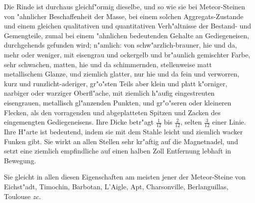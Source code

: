 \documentclass[a4paper, 11pt, oneside, german]{article}
\begin{document}
Die Rinde ist durchaus gleichf"ormig dieselbe, und so wie sie bei Meteor-Steinen von "ahnlicher Beschaffenheit der Masse, bei einem solchen Aggregats-Zustande und einem gleichen qualitativen und quantitativen Verh"altnisse der Bestand- und Gemengteile, zumal bei einem "ahnlichen bedeutenden Gehalte an Gediegeneisen, durchgehends gefunden wird; n"amlich: von schw"arzlich-brauner, hie und da, mehr oder weniger, mit eisengrau und ockergelb und br"aunlich gemischter Farbe, sehr schwachen, matten, hie und da schimmernden, stellenweise matt metallischem Glanze, und ziemlich glatter, nur hie und da fein und verworren, kurz und runzlicht-aderiger, gr"o"sten Teils aber klein und platt k"orniger, narbiger oder warziger Oberfl"ache, mit ziemlich h"aufig eingestreuten eisengrauen, metallisch gl"anzenden Punkten, und gr"o"seren oder kleineren Flecken, als den vorragenden und abgeplatteten Spitzen und Zacken des eingemengten Gediegeneisens. Ihre Dicke betr"agt $\frac{1}{12}$ bis $\frac{2}{12}$, selten $\frac{3}{12}$ einer Linie. Ihre H"arte ist bedeutend, indem sie mit dem Stahle leicht und ziemlich wacker Funken gibt. Sie wirkt an allen Stellen sehr kr"aftig auf die Magnetnadel, und setzt eine ziemlich empfindliche auf einen halben Zoll Entfernung lebhaft in Bewegung.

Sie gleicht in allen diesen Eigenschaften am meisten jener der Meteor-Steine von Eichst"adt, Timochin, Barbotan, L'Aigle, Apt, Charsonville, Berlanguillas, Toulouse \emph{zc.}
\end{document}
